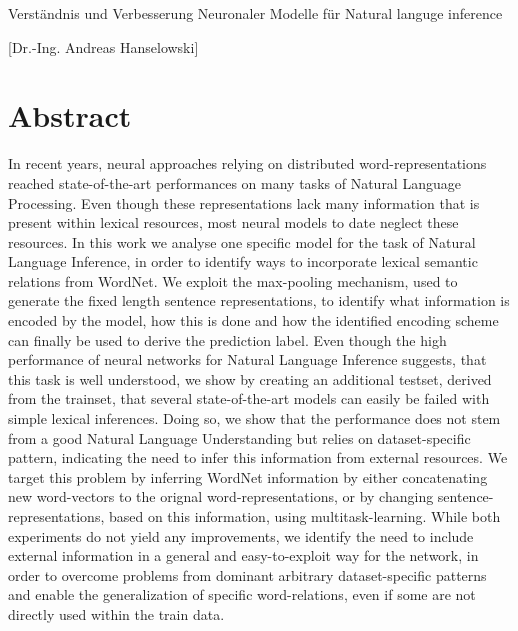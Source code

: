 \documentclass[article,type=msc,11pt,colorback,accentcolor=tud9c]{tudthesis}
\begin{document}
    {Verständnis und Verbesserung Neuronaler Modelle für Natural languge inference}
  \author{Max Glockner}
  [Dr.-Ing. Andreas Hanselowski]
  \makethesistitle

\section*{Abstract}
\addtocounter{section}{0}
In recent years, neural approaches relying on distributed word-representations reached state-of-the-art performances on many tasks of Natural Language Processing. Even though these representations lack many information that is present within lexical resources, most neural models to date neglect these resources. In this work we analyse one specific model for the task of Natural Language Inference, in order to identify ways to incorporate lexical semantic relations from WordNet. We exploit the max-pooling mechanism, used to generate the fixed length sentence representations, to identify what information is encoded by the model, how this is done and how the identified encoding scheme can finally be used to derive the prediction label. Even though the high performance of neural networks for Natural Language Inference suggests, that this task is well understood, we show by creating an additional testset, derived from the trainset, that several state-of-the-art models can easily be failed with simple lexical inferences. Doing so, we show that the performance does not stem from a good Natural Language Understanding but relies on dataset-specific pattern, indicating the need to infer this information from external resources. We target this problem by inferring WordNet information by either concatenating new word-vectors to the orignal word-representations, or by changing sentence-representations, based on this information, using multitask-learning. While both experiments do not yield any improvements, we identify the need to include external information in a general and easy-to-exploit way for the network, in order to overcome problems from dominant arbitrary dataset-specific patterns and enable the generalization of specific word-relations, even if some are not directly used within the train data.
\newpage\cleardoublepage
\end{document}
